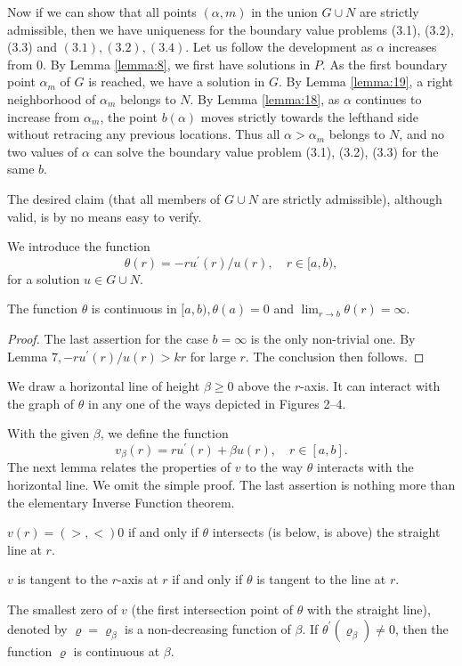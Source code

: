 Now if we can show that all points $(\alpha, m)$ in the union $G \cup N$ are strictly 
admissible, then we have uniqueness for the boundary value problems (3.1), (3.2), (3.3)
and $(3.1),(3.2),(3.4)$. Let us follow the development as $\alpha$ increases from 0.
By Lemma \ref{lemma:8}, we first have solutions in $P$. As the first boundary point $\alpha_m$ of $G$
is reached, we have a solution in $G$. By Lemma \ref{lemma:19}, a right neighborhood of $\alpha_m$
belongs to $N$. By Lemma \ref{lemma:18}, as $\alpha$ continues to increase from $\alpha_m$,
the point $b(\alpha)$ moves strictly towards the lefthand side without retracing
any previous locations. Thus all $\alpha>\alpha_m$ belongs to $N$, and no two values of
$\alpha$ can solve the boundary value problem (3.1), (3.2), (3.3) for the same $b$.

The desired claim (that all members of $G \cup N$ are strictly admissible), although valid,
is by no means easy to verify.

We introduce the function
\begin{equation}\label{eq:4.9}
  \theta(r)=-r u^{\prime}(r) / u(r), \quad r \in[a, b),
\end{equation}
for a solution $u \in G \cup N$.

\begin{lemma}\label{lemma:20}
  The function $\theta$ is continuous in $[a, b), \theta(a)=0$
  and $\lim _{r \rightarrow b} \theta(r)=\infty$.
\end{lemma}

\begin{proof}
  The last assertion for the case $b=\infty$ is the only non-trivial one.
  By Lemma $7,-r u^{\prime}(r) / u(r)>k r$ for large $r$. The conclusion then follows.
\end{proof}

We draw a horizontal line of height $\beta \geq 0$ above the $r$-axis. It can interact with the graph of $\theta$ in any one of the ways depicted in Figures 2--4.

With the given $\beta$, we define the function
\begin{equation}\label{eq:4.10}
  v_\beta(r)=r u^{\prime}(r)+\beta u(r), \quad r \in[a, b].  
\end{equation}
The next lemma relates the properties of $v$ to the way $\theta$ interacts
with the horizontal line. We omit the simple proof.
The last assertion is nothing more than the elementary Inverse Function theorem.

\begin{lemma}\label{lemma:21}
  $v(r)=(>,<) 0$ if and only if $\theta$ intersects (is below, is above)
  the straight line at $r$.

  $v$ is tangent to the $r$-axis at $r$ if and only if $\theta$ is tangent to the line at $r$.
  
  The smallest zero of $v$ (the first intersection point of $\theta$ with the straight line), 
  denoted by $\varrho=\varrho_\beta$ is a non-decreasing function of $\beta$.
  If $\theta^{\prime}\left(\varrho_\beta\right) \neq 0$, then the function $\varrho$ is 
  continuous at $\beta$.
\end{lemma}

